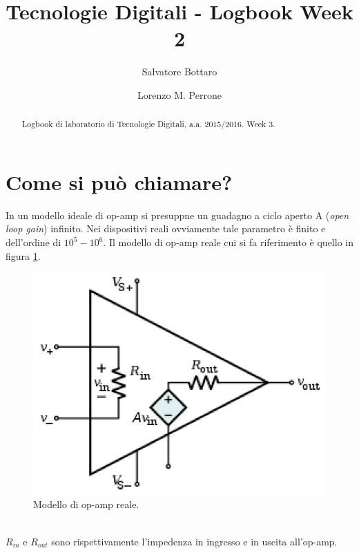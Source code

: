 \documentclass[journal, a4paper]{IEEEtran}
\begin{document}
	\title{Tecnologie Digitali - Logbook Week 2}
	\author[1]{Salvatore Bottaro}
		\author[2]{Lorenzo M. Perrone}
	\maketitle
	
\begin{abstract}
	Logbook di laboratorio di Tecnologie Digitali, a.a. 2015/2016. Week 3.
\end{abstract}

\section{Come si può chiamare?}

In un modello ideale di op-amp si presuppne un guadagno a ciclo aperto A (\textit{open loop gain}) infinito. Nei dispositivi reali ovviamente tale parametro è finito e dell'ordine di $10^5 - 10^6$. Il modello di op-amp reale cui si fa riferimento è quello in figura \ref{fig:op-amp-real}.

\begin{figure}[htp]
\includegraphics[scale=0.4]{op-amp_real}
\caption{Modello di op-amp reale.}
\label{fig:op-amp-real}
\end{figure}
~\\
$R_{in}$ e $R_{out}$ sono rispettivamente l'impedenza in ingresso e in uscita all'op-amp.
 
\end{document}
